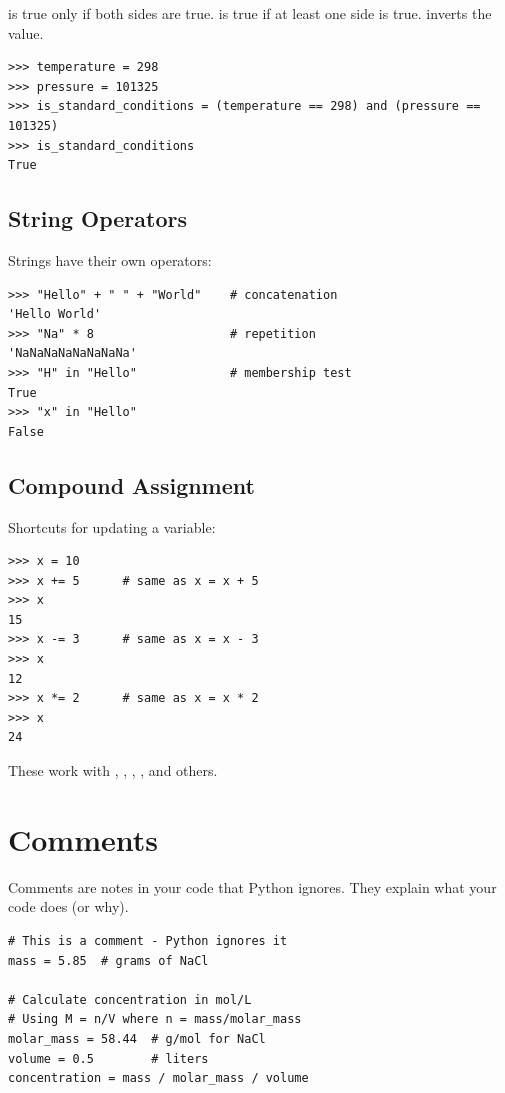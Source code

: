  is true only if both sides are true.  is true if at least one side is true.  inverts the value.

\begin{lstlisting}
>>> temperature = 298
>>> pressure = 101325
>>> is_standard_conditions = (temperature == 298) and (pressure == 101325)
>>> is_standard_conditions
True
\end{lstlisting}

\subsection{String Operators}

Strings have their own operators:

\begin{lstlisting}
>>> "Hello" + " " + "World"    # concatenation
'Hello World'
>>> "Na" * 8                   # repetition
'NaNaNaNaNaNaNaNa'
>>> "H" in "Hello"             # membership test
True
>>> "x" in "Hello"
False
\end{lstlisting}

\subsection{Compound Assignment}

Shortcuts for updating a variable:

\begin{lstlisting}
>>> x = 10
>>> x += 5      # same as x = x + 5
>>> x
15
>>> x -= 3      # same as x = x - 3
>>> x
12
>>> x *= 2      # same as x = x * 2
>>> x
24
\end{lstlisting}

These work with \py{+=}, \py{-=}, \py{*=}, \py{/=}, and others.

\section{Comments}
\label{sec:comments}

Comments are notes in your code that Python ignores. They explain what your code does (or why).

\begin{lstlisting}
# This is a comment - Python ignores it
mass = 5.85  # grams of NaCl

# Calculate concentration in mol/L
# Using M = n/V where n = mass/molar_mass
molar_mass = 58.44  # g/mol for NaCl
volume = 0.5        # liters
concentration = mass / molar_mass / volume
\end{lstlisting}

